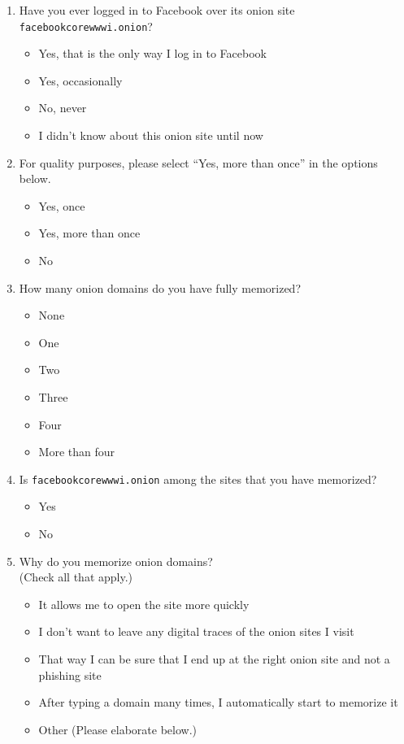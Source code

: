\begin{enumerate}
    \item Have you ever logged in to Facebook over its onion site
        \texttt{facebookcorewwwi.onion}?
        \begin{itemize}[label=$\Circle$]
            \item Yes, that is the only way I log in to Facebook
            \item Yes, occasionally
            \item No, never
            \item I didn't know about this onion site until now
        \end{itemize}

    \item For quality purposes, please select ``Yes, more than once'' in the
        options below.
        \begin{itemize}[label=$\Circle$]
            \item Yes, once
            \item Yes, more than once
            \item No
        \end{itemize}

    \item How many onion domains do you have fully memorized?
        \label{q3_12}
        \begin{itemize}[label=$\Circle$]
            \item None
            \item One
            \item Two
            \item Three
            \item Four
            \item More than four
        \end{itemize}

    \item Is \texttt{facebookcorewwwi.onion} among the sites that you have
        memorized?
        \begin{itemize}[label=$\Circle$]
            \item Yes
            \item No
        \end{itemize}

    \item Why do you memorize onion domains?\\(Check all that apply.)
        \begin{itemize}[label=$\Square$]
            \item It allows me to open the site more quickly
            \item I don't want to leave any digital traces of the onion sites I
                visit
            \item That way I can be sure that I end up at the right onion site
                and not a phishing site
            \item After typing a domain many times, I automatically start to
                memorize it
            \item Other (Please elaborate below.)
        \end{itemize}


\end{enumerate}
